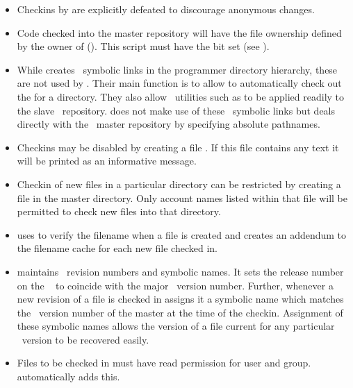 \begin{itemize}
\item
   Checkins by  are explicitly defeated to discourage anonymous
   changes.

\item
   Code checked into the master repository will have the file ownership
   defined by the owner of  ().
   This script must have the  bit set (see ).

\item
   While  creates \rcs\ symbolic links in the programmer
   directory hierarchy, these are not used by .  Their main function
   is to allow  to automatically check out the 
   for a directory.  They also allow \rcs\ utilities such as  to
   be applied readily to the slave \rcs\ repository.   does not make
   use of these \rcs\ symbolic links but deals directly with the \aipspp\ 
   master repository by specifying absolute pathnames.

\item
   Checkins may be disabled by creating a file .
   If this file contains any text it will be printed as an informative
   message.

\item
   Checkin of new files in a particular directory can be restricted by
   creating a \file{.ai\_control} file in the master directory.  Only account
   names listed within that file will be permitted to check new files into
   that directory.

\item
    uses  to verify the filename when a file is created and
   creates an addendum to the \aipsexe{av} filename cache for each new file
   checked in.

\item
    maintains \rcs\ revision numbers and symbolic names.  It sets the
   release number on the \rcs\ \code{trunk} to coincide with the major
   \aipspp\ version number.  Further, whenever a new revision of a file is
   checked in \exe{ai} assigns it a symbolic name which matches the \aipspp\ 
   version number of the master at the time of the checkin.  Assignment of
   these symbolic names allows the version of a file current for any
   particular \aipspp\ version to be recovered easily.

\item
   Files to be checked in must have read permission for user and group.
    automatically adds this.
\end{itemize}

